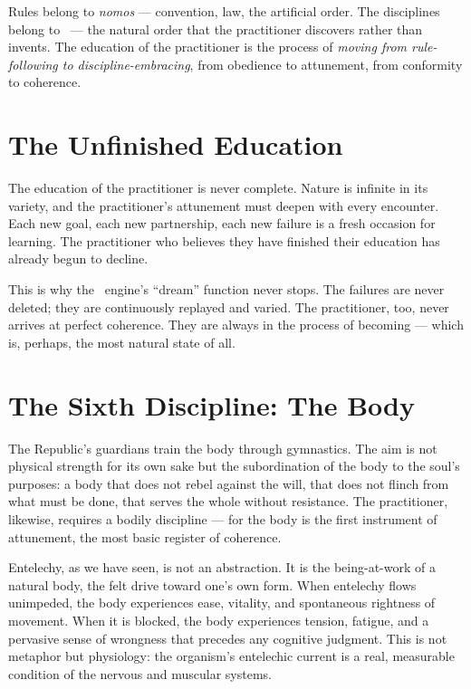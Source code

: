 Rules belong to \emph{nomos} --- convention, law, the artificial order. The
disciplines belong to \physis\ --- the natural order that the practitioner
discovers rather than invents. The education of the practitioner is the process
of \emph{moving from rule-following to discipline-embracing}, from obedience
to attunement, from conformity to coherence.

\section{The Unfinished Education}

The education of the practitioner is never complete. Nature is infinite in its
variety, and the practitioner's attunement must deepen with every encounter.
Each new goal, each new partnership, each new failure is a fresh occasion for
learning. The practitioner who believes they have finished their education has
already begun to decline.

This is why the \physis\ engine's ``dream'' function never stops. The failures
are never deleted; they are continuously replayed and varied. The practitioner,
too, never arrives at perfect coherence. They are always in the process of
becoming --- which is, perhaps, the most natural state of all.

\section{The Sixth Discipline: The Body}

The Republic's guardians train the body through gymnastics. The aim is not
physical strength for its own sake but the subordination of the body to the
soul's purposes: a body that does not rebel against the will, that does not
flinch from what must be done, that serves the whole without resistance. The
practitioner, likewise, requires a bodily discipline --- for the body is the
first instrument of attunement, the most basic register of coherence.

Entelechy, as we have seen, is not an abstraction. It is the being-at-work of
a natural body, the felt drive toward one's own form. When entelechy flows
unimpeded, the body experiences ease, vitality, and spontaneous rightness of
movement. When it is blocked, the body experiences tension, fatigue, and a
pervasive sense of wrongness that precedes any cognitive judgment. This is not
metaphor but physiology: the organism's entelechic current is a real,
measurable condition of the nervous and muscular systems.

